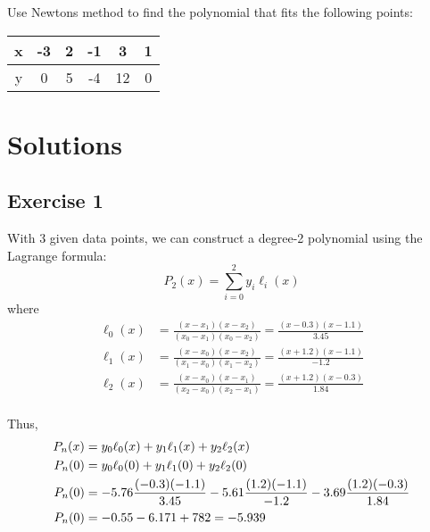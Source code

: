 \documentclass[12pt]{article}
\newenvironment{exercise}[2][Exercise]{\begin{trivlist}
\item[\hskip \labelsep {\bfseries #1}\hskip \labelsep {\bfseries #2.}]}{\end{trivlist}}
\begin{document}
\begin{exercise}{4} %
  Use Newton\textquotesingle s method to find the polynomial that fits the following points:\\
  \begin{table}[h]
    \centering
    \begin{tabular}{|c|c|c|c|c|c|}
      \hline
      x & -3 & 2 & -1 & 3 & 1 \\ \hline
      y & 0 & 5 & -4 & 12 & 0 \\ \hline
    \end{tabular}
  \end{table}
\end{exercise}

\break

\section{Solutions}

\subsection{Exercise 1}

With 3 given data points, we can construct a degree-2 polynomial using the Lagrange formula:\\
$$P_{2}(x)=\sum_{i=0}^2 y_{i}\ell_{i}(x)$$
where
\begin{align}
\ell_{0}(x)&=\frac{(x-x_1)(x-x_2)}{(x_0-x_1)(x_0-x_2)}=\frac{(x-0.3)(x-1.1)}{3.45} \\
\ell_{1}(x)&=\frac{(x-x_0)(x-x_2)}{(x_1-x_0)(x_1-x_2)}=\frac{(x+1.2)(x-1.1)}{-1.2} \\
\ell_{2}(x)&=\frac{(x-x_0)(x-x_1)}{(x_2-x_0)(x_2-x_1)}=\frac{(x+1.2)(x-0.3)}{1.84}
\end{align} \\
Thus,
\begin{align}
\notag
P_{n}(x) &=y_0\ell_0(x) + y_1\ell_1(x) + y_2\ell_2(x) \\ \notag
P_{n}(0) &=y_0\ell_0(0) + y_1\ell_1(0) + y_2\ell_2(0) \\ \notag
P_{n}(0) &=-5.76 \frac{(-0.3)(-1.1)}{3.45} -5.61 \frac{(1.2)(-1.1)}{-1.2} - 3.69 \frac{(1.2)(-0.3)}{1.84} \\ \notag
P_{n}(0) &= -0.55-6.171+782 = -5.939 \notag
\end{align}
\end{document}

